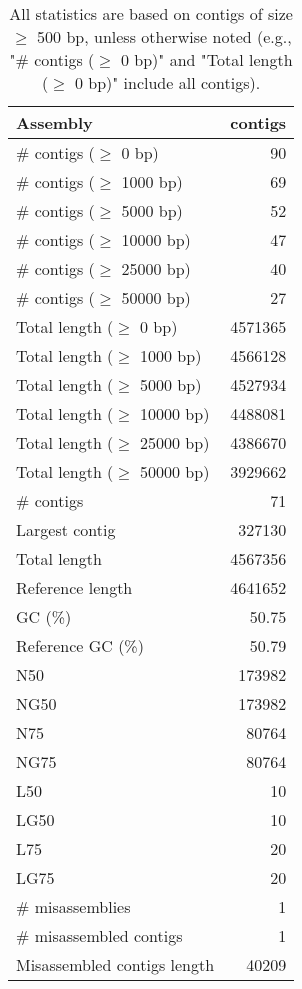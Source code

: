 \documentclass[12pt,a4paper]{article}
\begin{document}
\begin{table}[ht]
\begin{center}
\caption{All statistics are based on contigs of size $\geq$ 500 bp, unless otherwise noted (e.g., "\# contigs ($\geq$ 0 bp)" and "Total length ($\geq$ 0 bp)" include all contigs).}
\begin{tabular}{|l*{1}{|r}|}
\hline
Assembly & contigs \\ \hline
\# contigs ($\geq$ 0 bp) & 90 \\ \hline
\# contigs ($\geq$ 1000 bp) & 69 \\ \hline
\# contigs ($\geq$ 5000 bp) & 52 \\ \hline
\# contigs ($\geq$ 10000 bp) & 47 \\ \hline
\# contigs ($\geq$ 25000 bp) & 40 \\ \hline
\# contigs ($\geq$ 50000 bp) & 27 \\ \hline
Total length ($\geq$ 0 bp) & 4571365 \\ \hline
Total length ($\geq$ 1000 bp) & 4566128 \\ \hline
Total length ($\geq$ 5000 bp) & 4527934 \\ \hline
Total length ($\geq$ 10000 bp) & 4488081 \\ \hline
Total length ($\geq$ 25000 bp) & 4386670 \\ \hline
Total length ($\geq$ 50000 bp) & 3929662 \\ \hline
\# contigs & 71 \\ \hline
Largest contig & 327130 \\ \hline
Total length & 4567356 \\ \hline
Reference length & 4641652 \\ \hline
GC (\%) & 50.75 \\ \hline
Reference GC (\%) & 50.79 \\ \hline
N50 & 173982 \\ \hline
NG50 & 173982 \\ \hline
N75 & 80764 \\ \hline
NG75 & 80764 \\ \hline
L50 & 10 \\ \hline
LG50 & 10 \\ \hline
L75 & 20 \\ \hline
LG75 & 20 \\ \hline
\# misassemblies & 1 \\ \hline
\# misassembled contigs & 1 \\ \hline
Misassembled contigs length & 40209 \\ \hline

\end{tabular}
\end{center}
\end{table}
\end{document}
